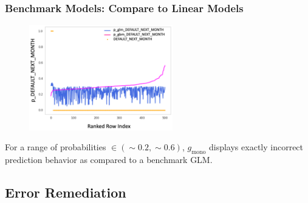 \documentclass[11pt,
               aspectratio=43,
               hyperref={colorlinks}
               ]{beamer}
\begin{document}
			\begin{frame}
		
				\frametitle{\textbf{Benchmark Models}: Compare to Linear Models}
				\begin{figure}
					\begin{center}
						\includegraphics[height=130pt]{img/benchmark.png}
					\end{center}
				\end{figure}	
				\vspace{-10pt}
				For a range of probabilities $\in  (\sim0.2, \sim0.6)$, $g_{\text{mono}}$ displays exactly incorrect prediction behavior as compared to a benchmark GLM.
			\end{frame}

		\subsection{Error Remediation}
\end{document}
